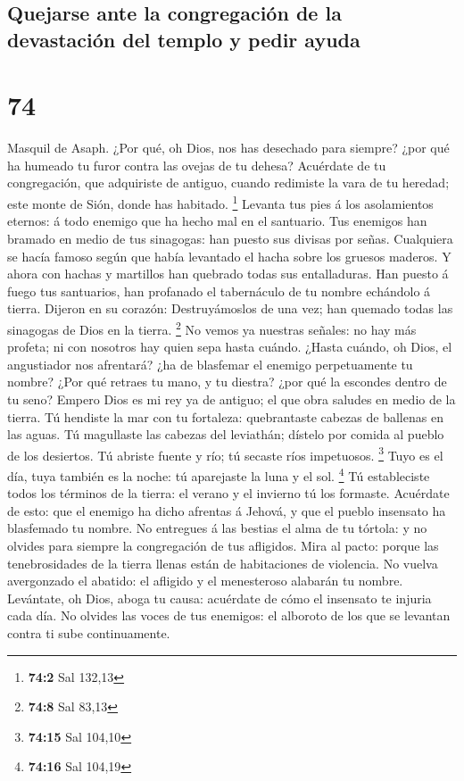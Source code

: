 \hypertarget{quejarse-ante-la-congregaciuxf3n-de-la-devastaciuxf3n-del-templo-y-pedir-ayuda}{%
\subsection{Quejarse ante la congregación de la devastación del templo y
pedir
ayuda}\label{quejarse-ante-la-congregaciuxf3n-de-la-devastaciuxf3n-del-templo-y-pedir-ayuda}}

\hypertarget{section-73}{%
\section{74}\label{section-73}}

 Masquil de Asaph. ¿Por qué, oh Dios, nos has desechado para
siempre? ¿por qué ha humeado tu furor contra las ovejas de tu dehesa?
 Acuérdate de tu congregación, que adquiriste de antiguo,
cuando redimiste la vara de tu heredad; este monte de Sión, donde has
habitado. \footnote{\textbf{74:2} Sal 132,13}  Levanta tus
pies á los asolamientos eternos: á todo enemigo que ha hecho mal en el
santuario.  Tus enemigos han bramado en medio de tus
sinagogas: han puesto sus divisas por señas.  Cualquiera se
hacía famoso según que había levantado el hacha sobre los gruesos
maderos.  Y ahora con hachas y martillos han quebrado todas
sus entalladuras.  Han puesto á fuego tus santuarios, han
profanado el tabernáculo de tu nombre echándolo á tierra. 
Dijeron en su corazón: Destruyámoslos de una vez; han quemado todas las
sinagogas de Dios en la tierra. \footnote{\textbf{74:8} Sal 83,13}
 No vemos ya nuestras señales: no hay más profeta; ni con
nosotros hay quien sepa hasta cuándo.  ¿Hasta cuándo, oh
Dios, el angustiador nos afrentará? ¿ha de blasfemar el enemigo
perpetuamente tu nombre?  ¿Por qué retraes tu mano, y tu
diestra? ¿por qué la escondes dentro de tu seno?  Empero
Dios es mi rey ya de antiguo; el que obra saludes en medio de la tierra.
 Tú hendiste la mar con tu fortaleza: quebrantaste cabezas
de ballenas en las aguas.  Tú magullaste las cabezas del
leviathán; dístelo por comida al pueblo de los desiertos. 
Tú abriste fuente y río; tú secaste ríos impetuosos. \footnote{\textbf{74:15}
  Sal 104,10}  Tuyo es el día, tuya también es la noche: tú
aparejaste la luna y el sol. \footnote{\textbf{74:16} Sal 104,19}
 Tú estableciste todos los términos de la tierra: el verano
y el invierno tú los formaste.  Acuérdate de esto: que el
enemigo ha dicho afrentas á Jehová, y que el pueblo insensato ha
blasfemado tu nombre.  No entregues á las bestias el alma
de tu tórtola: y no olvides para siempre la congregación de tus
afligidos.  Mira al pacto: porque las tenebrosidades de la
tierra llenas están de habitaciones de violencia.  No
vuelva avergonzado el abatido: el afligido y el menesteroso alabarán tu
nombre.  Levántate, oh Dios, aboga tu causa: acuérdate de
cómo el insensato te injuria cada día.  No olvides las
voces de tus enemigos: el alboroto de los que se levantan contra ti sube
continuamente.

